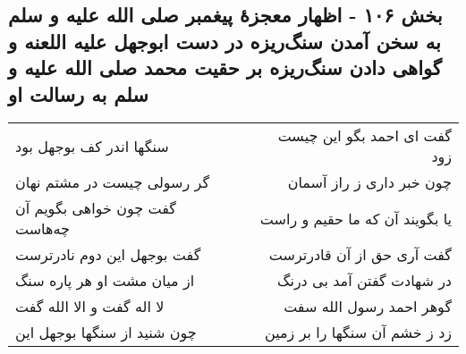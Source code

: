 \begin{center}
\section*{بخش ۱۰۶ - اظهار معجزهٔ پیغمبر صلی الله علیه و سلم به سخن آمدن سنگ‌ریزه در دست ابوجهل علیه اللعنه و گواهی دادن سنگ‌ریزه بر حقیت محمد صلی الله علیه و سلم به رسالت او}
\label{sec:sh106}
\begin{longtable}{l p{0.5cm} r}
سنگها اندر کف بوجهل بود
&&
گفت ای احمد بگو این چیست زود
\\
گر رسولی چیست در مشتم نهان
&&
چون خبر داری ز راز آسمان
\\
گفت چون خواهی بگویم آن چه‌هاست
&&
یا بگویند آن که ما حقیم و راست
\\
گفت بوجهل این دوم نادرترست
&&
گفت آری حق از آن قادرترست
\\
از میان مشت او هر پاره سنگ
&&
در شهادت گفتن آمد بی درنگ
\\
لا اله گفت و الا الله گفت
&&
گوهر احمد رسول الله سفت
\\
چون شنید از سنگها بوجهل این
&&
زد ز خشم آن سنگها را بر زمین
\\
\end{longtable}
\end{center}
